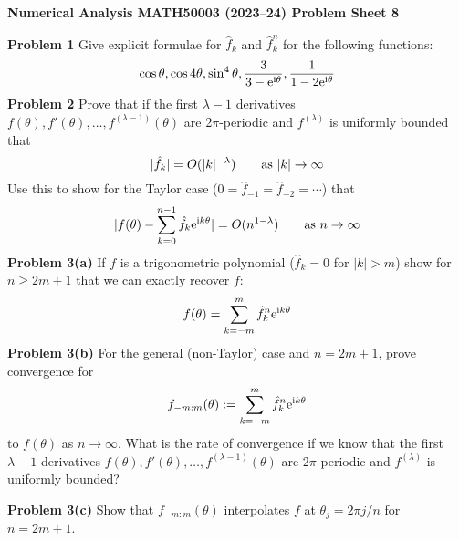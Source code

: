 \documentclass[12pt,a4paper]{article}
\def\endash{–}
\begin{document}
\textbf{Numerical Analysis MATH50003 (2023\ensuremath{\endash}24) Problem Sheet 8}

\textbf{Problem 1} Give explicit formulae for $\hat f_k$ and $\hat f_k^n$ for the following functions:
\[
\cos \ensuremath{\theta}, \cos 4\ensuremath{\theta}, \sin^4\ensuremath{\theta}, {3 \over 3 - {\rm e}^{\rm i \ensuremath{\theta}}}, {1 \over 1 - 2{\rm e}^{\rm i \ensuremath{\theta}}}
\]
\textbf{Problem 2} Prove that if the first $\ensuremath{\lambda}-1$ derivatives $f(\ensuremath{\theta}), f'(\ensuremath{\theta}), \ensuremath{\ldots}, f^{(\ensuremath{\lambda}-1)}(\ensuremath{\theta})$  are 2\ensuremath{\pi}-periodic and $f^{(\ensuremath{\lambda})}$ is uniformly bounded  that
\[
|\hat f_k| = O(|k|^{-\ensuremath{\lambda}})\qquad \hbox{as $|k| \ensuremath{\rightarrow} \ensuremath{\infty}$}
\]
Use this to show for the Taylor case ($0 = \hat f_{-1} = \hat f_{-2} = \ensuremath{\cdots}$) that
\[
|f(\ensuremath{\theta}) - \ensuremath{\sum}_{k=0}^{n-1} \hat f_k {\rm e}^{{\rm i}k\ensuremath{\theta}}| = O(n^{1-\ensuremath{\lambda}})\qquad \hbox{as $n \ensuremath{\rightarrow} \ensuremath{\infty}$}
\]
\textbf{Problem 3(a)} If $f$ is a trigonometric polynomial  ($\hat f_k = 0$ for $|k| > m$) show for $n \ensuremath{\geq} 2m+1$ that we can exactly recover $f$:
\[
f(\ensuremath{\theta}) = \sum_{k=-m}^m \hat f_k^n {\rm e}^{{\rm i} k \ensuremath{\theta}}
\]
\textbf{Problem 3(b)} For the general (non-Taylor) case and $n = 2m+1$, prove convergence for
\[
f_{-m:m}(\ensuremath{\theta}) := \ensuremath{\sum}_{k=-m}^m \hat f_k^n {\rm e}^{{\rm i} k \ensuremath{\theta}}
\]
to $f(\ensuremath{\theta})$ as $n \ensuremath{\rightarrow} \ensuremath{\infty}$. What is the rate of convergence if we know that the first $\ensuremath{\lambda}-1$ derivatives $f(\ensuremath{\theta}), f'(\ensuremath{\theta}), \ensuremath{\ldots}, f^{(\ensuremath{\lambda}-1)}(\ensuremath{\theta})$  are 2\ensuremath{\pi}-periodic and $f^{(\ensuremath{\lambda})}$ is uniformly bounded?

\textbf{Problem 3(c)} Show that $f_{-m:m}(\ensuremath{\theta})$ interpolates $f$ at $\ensuremath{\theta}_j = 2\ensuremath{\pi}j/n$ for $n = 2m+1$.
\end{document}
